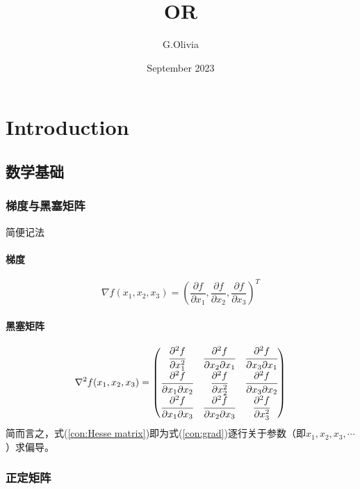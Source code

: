 \documentclass{book}
\title{OR}
\author{G.Olivia}
\date{September 2023}
\begin{document}
\maketitle

\tableofcontents

\chapter{Introduction}
\section{数学基础}
\subsection{梯度与黑塞矩阵}
简便记法

\subsubsection{梯度}

\begin{equation}
\nabla f(x_1, x_2, x_3) = (\frac{\partial f}{\partial x_1}, \frac{\partial f}{\partial x_2}, \frac{\partial f}{\partial x_3})^T
\label{con:grad}
\end{equation}

\subsubsection{黑塞矩阵}

\begin{equation}
\nabla^2 f(x_1, x_2, x_3)= 
\begin{pmatrix}
\cfrac{\partial^2 f}{\partial x_1^2} & \cfrac{\partial^2 f}{\partial x_2\partial x_1} & \cfrac{\partial^2 f}{\partial x_3\partial x_1} \\
\cfrac{\partial^2 f}{\partial x_1\partial x_2} & \cfrac{\partial^2 f}{\partial x_2^2} & \cfrac{\partial^2 f}{\partial x_3\partial x_2} \\
\cfrac{\partial^2 f}{\partial x_1\partial x_3} & \cfrac{\partial^2 f}{\partial x_2 \partial x_3} & \cfrac{\partial^2 f}
{\partial x_3^2}
\label{con:Hesse matrix}
\end{pmatrix}
\end{equation}
简而言之，式(\ref{con:Hesse matrix})即为式(\ref{con:grad})逐行关于参数（即$x_1, x_2, x_3, \cdots$）求偏导。

\subsection{正定矩阵}
\end{document}
